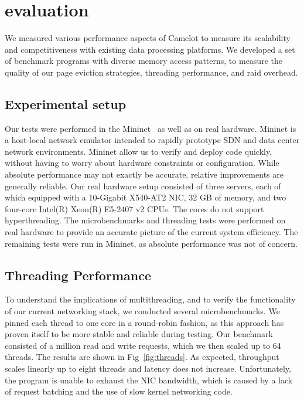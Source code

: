 \section{evaluation}
\label{sec:eval}

We measured various performance aspects of Camelot to measure its
scalability and competitiveness with existing data processing
platforms. We developed a set of benchmark programs with diverse
memory access patterns, to measure the quality of our page eviction
strategies, threading performance, and raid overhead.

\subsection{Experimental setup}
Our tests were performed in the Mininet~\cite{mininet} as well as on real hardware.
Mininet is a host-local network emulator intended to rapidly prototype SDN and data center network environments. Mininet allow us to verify and deploy code quickly, without having to worry about hardware constraints or configuration. While absolute performance may not exactly be accurate, relative improvements are generally reliable. 
Our real hardware setup consisted of three servers, each of which equipped with a 10-Gigabit X540-AT2 NIC, 32 GB of memory, and two four-core Intel(R) Xeon(R) E5-2407 v2 CPUs. The cores do not support hyperthreading.
The microbenchmarks and threading tests were performed on real hardware to provide an accurate picture of the current system efficiency. The remaining tests were run in Mininet, as absolute performance was not of concern.

\subsection{Threading Performance}
To understand the implications of multithreading, and to verify the functionality of our current networking stack, we conducted several microbenchmarks. We pinned each thread to one core in a round-robin fashion, as this approach has proven itself to be more stable and reliable during testing. Our benchmark consisted of a million read and write requests, which we then scaled up to 64 threads. The results are shown in Fig~\ref{fig:threads}.
As expected, throughput scales linearly up to eight threads and latency does not increase. Unfortunately, the program is unable to exhaust the NIC bandwidth, which is caused by a lack of request batching and the use of slow kernel networking code.

